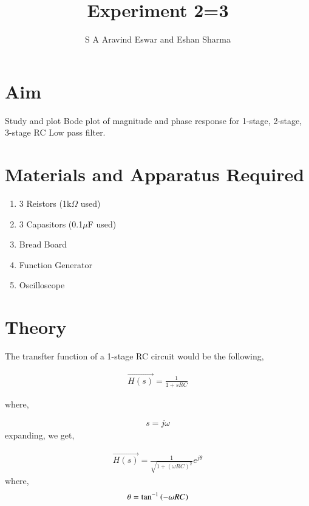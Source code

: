 \documentclass[journal]{IEEEtran}
\begin{document}

\vspace{3cm}

\title{Experiment 2=3} 
\author{S A Aravind Eswar and Eshan Sharma}
{\let\newpage\relax\maketitle}

\section{Aim}

Study and plot Bode plot of magnitude and phase response for 1-stage, 2-stage, 3-stage RC Low pass filter.

\section{Materials and Apparatus Required}

\begin{enumerate}
    \item 3 Reistors (1k$\Omega$ used)
    \item 3 Capasitors (0.1$\mu$F used)
    \item Bread Board
    \item Function Generator
    \item Oscilloscope
\end{enumerate}

\section{Theory}

The transfter function of a 1-stage RC circuit would be the following,

\begin{align*}
    \vec{H(s)} = \frac{1}{1+sRC}
\end{align*}

where,

\begin{align*}
    s = j\omega
\end{align*}
expanding, we get,

\begin{align*}
    \vec{H(s)} = \frac{1}{\sqrt{1+(\omega RC)^2}} e^{j\theta}
\end{align*}
where,
\begin{align*}
    \theta = \tan^{-1}\left(-\omega RC\right)
\end{align*}
\end{document}

